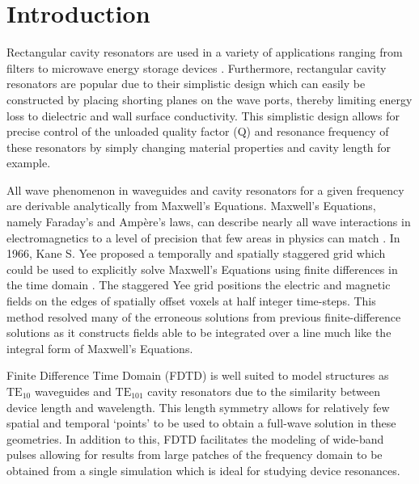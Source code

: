\section{Introduction}
\label{sec:intro}
Rectangular cavity resonators are used in a variety of applications ranging from filters to microwave energy storage devices \cite{pozar2011microwave}. Furthermore, rectangular cavity resonators are popular due to their simplistic design which can easily be constructed by placing shorting planes on the wave ports, thereby limiting energy loss to dielectric and wall surface conductivity\cite{pozar2011microwave}. This simplistic design allows for precise control of the unloaded quality factor (Q) and resonance frequency of these resonators by simply changing material properties and cavity length for example.

All wave phenomenon in waveguides and cavity resonators for a given frequency are derivable analytically from Maxwell's Equations. Maxwell's Equations, namely Faraday's and Amp\`{e}re's laws, can describe nearly all wave interactions in electromagnetics to a level of precision that few areas in physics can match \cite{rothlecnotes}. In 1966, Kane S. Yee proposed a temporally and spatially staggered grid which could be used to explicitly solve Maxwell's Equations using finite differences in the time domain \cite{yee}. The staggered Yee grid positions the electric and magnetic fields on the edges of spatially offset voxels at half integer time-steps\cite{yee}. This method resolved many of the erroneous solutions from previous finite-difference solutions as it constructs fields able to be integrated over a line\cite{rothlecnotes} much like the integral form of Maxwell's Equations.

Finite Difference Time Domain (FDTD) is well suited to model structures as $\mathrm{TE_{10}}$ waveguides and $\mathrm{TE_{101}}$ cavity resonators due to the similarity between device length and wavelength. This length symmetry allows for relatively few spatial and temporal `points' to be used to obtain a full-wave solution in these geometries. In addition to this, FDTD facilitates the modeling of wide-band pulses allowing for results from large patches of the frequency domain to be obtained from a single simulation which is ideal for studying device resonances.